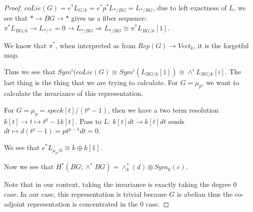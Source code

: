\documentclass[../main.tex]{subfiles}
\begin{document}
\begin{proof}


$coLie(G) = e^*L_{G/k} = e^* p^* L_{*/BG} = L_{*/BG}$, due to left exactness of $L$, we see that $* \rightarrow{BG} \rightarrow *$ gives us a fiber sequence: $\pi^*L_{BG/k} \rightarrow L_{*/*} = 0 \rightarrow L_{*/BG} \Rightarrow L_{*/BG} \cong \pi^*L_{BG/k}[1]$. 

We know that $\pi^*$, when interpreted as from $Rep(G) \rightarrow Vect_k$, it is the forgetful map. 

Thus we see that $Sym^i(coLie(G) \cong Sym^i(L_{BG/k}[1]) \cong \wedge^iL_{BG/k}[i]$. The last thing is the thing that we are trying to calculate. For $G = \mu_p$, we want to calculate the invariance of this representation.

For $G = \mu_p = spec k[t]/(t^p -1)$, then we have a two term resolution $k[t] \rightarrow{t \mapsto t^p -1} k[t]$. Pass to $L$: $k[t]dt \rightarrow k[t]dt$ sends $dt \mapsto d(t^p-1) = pt^{p-1}dt = 0$. 

We see that $e^*L_{\mu_p/k} \cong k \oplus k[1]$. 

Now we see that $H^*(BG; \wedge^*BG) = \wedge^*_k(d) \otimes Sym_k(c)$. 

Note that in our context, taking the invariance is exactly taking the degree 0 case. In our case, this representation is trivial because $G$ is abelian thus the co-adjoint representation is concentrated in the 0 case.



\end{proof}

\listoftodos
\end{document}
